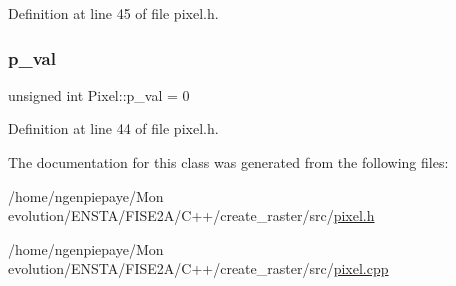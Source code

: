 Definition at line 45 of file pixel.\+h.

\mbox{\label{class_pixel_ab220df144b119969f66eb5fb5d75c9bb}} 
\subsubsection{\texorpdfstring{p\+\_\+val}{p\_val}}
{\footnotesize\ttfamily unsigned int Pixel\+::p\+\_\+val = 0}



Definition at line 44 of file pixel.\+h.



The documentation for this class was generated from the following files\+:\begin{DoxyCompactItemize}
\item 
/home/ngenpiepaye/\+Mon evolution/\+E\+N\+S\+T\+A/\+F\+I\+S\+E2\+A/\+C++/create\+\_\+raster/src/\hyperlink{pixel_8h}{pixel.\+h}\item 
/home/ngenpiepaye/\+Mon evolution/\+E\+N\+S\+T\+A/\+F\+I\+S\+E2\+A/\+C++/create\+\_\+raster/src/\hyperlink{pixel_8cpp}{pixel.\+cpp}\end{DoxyCompactItemize}
